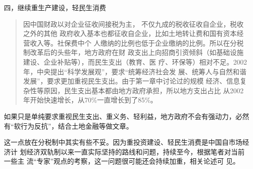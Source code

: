 {\heiti 四，继续重生产建设，轻民生消费}

\begin{quotation}
  因中国财政以对企业征收间接税为主， 不仅九成的税收征收自企业，税收之外的其他
  政府收入基本也都征收自企业，比如土地转让费和国有资本经营收入等。社保费中个
  人缴纳的比例也低于企业缴纳的比例。所以在分税制改革后的头些年，地方政府在财
  政支出上向招商引资倾斜（如基础设施建设、企业补贴等），而民生支出（教育、医
  疗、环保等）相对不足。2002年，中央提出“科学发展观”，要求“统筹经济社会发
  展、统筹人与自然和谐发展”，要求更加重视民生支出。由于第一章中讨论过的规模
  经济、信息复杂性等原因，民生支出基本都由地方政府承担，所以地方支出占比
  从2002年开始快速增长，从70\%一直增长到了85\%。\cite{zhishenshinei}
\end{quotation}
如果只是单纯要求重视民生支出、重义务、轻利益，地方政府不会有强动力，必然
有“软行为反抗”，结合土地金融等做文章。

这一点放在分税制中其实有些不妥。因为重投资建设、轻民生消费是中国自市场经济计
划经济双轨制以来一直实际坚持的路线和问题，持续至今，根据笔者对当前一些主
流“专家”观点的考察，这一问题很可能还会持续加重，相关论述可
见。









